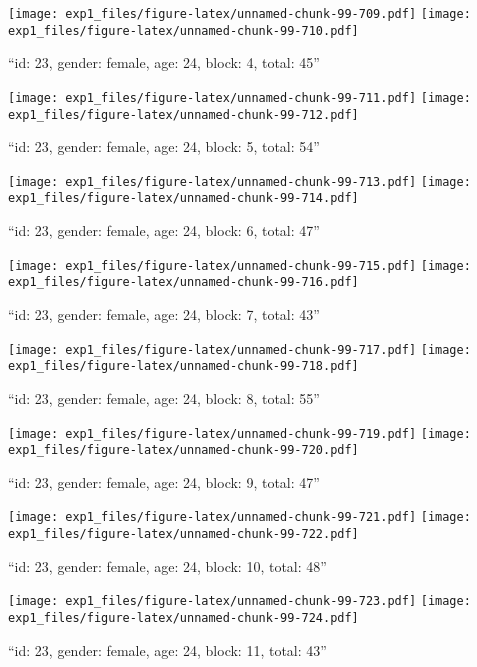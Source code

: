 \documentclass[,]{article}
\begin{document}
\texttt{[image: exp1\_files/figure-latex/unnamed-chunk-99-709.pdf]}
\texttt{[image: exp1\_files/figure-latex/unnamed-chunk-99-710.pdf]}

\newpage
[1] 

``id: 23, gender: female, age: 24, block: 4, total: 45''

\texttt{[image: exp1\_files/figure-latex/unnamed-chunk-99-711.pdf]}
\texttt{[image: exp1\_files/figure-latex/unnamed-chunk-99-712.pdf]}

\newpage
[1] 

``id: 23, gender: female, age: 24, block: 5, total: 54''

\texttt{[image: exp1\_files/figure-latex/unnamed-chunk-99-713.pdf]}
\texttt{[image: exp1\_files/figure-latex/unnamed-chunk-99-714.pdf]}

\newpage
[1] 

``id: 23, gender: female, age: 24, block: 6, total: 47''

\texttt{[image: exp1\_files/figure-latex/unnamed-chunk-99-715.pdf]}
\texttt{[image: exp1\_files/figure-latex/unnamed-chunk-99-716.pdf]}

\newpage
[1] 

``id: 23, gender: female, age: 24, block: 7, total: 43''

\texttt{[image: exp1\_files/figure-latex/unnamed-chunk-99-717.pdf]}
\texttt{[image: exp1\_files/figure-latex/unnamed-chunk-99-718.pdf]}

\newpage
[1] 

``id: 23, gender: female, age: 24, block: 8, total: 55''

\texttt{[image: exp1\_files/figure-latex/unnamed-chunk-99-719.pdf]}
\texttt{[image: exp1\_files/figure-latex/unnamed-chunk-99-720.pdf]}

\newpage
[1] 

``id: 23, gender: female, age: 24, block: 9, total: 47''

\texttt{[image: exp1\_files/figure-latex/unnamed-chunk-99-721.pdf]}
\texttt{[image: exp1\_files/figure-latex/unnamed-chunk-99-722.pdf]}

\newpage
[1] 

``id: 23, gender: female, age: 24, block: 10, total: 48''

\texttt{[image: exp1\_files/figure-latex/unnamed-chunk-99-723.pdf]}
\texttt{[image: exp1\_files/figure-latex/unnamed-chunk-99-724.pdf]}

\newpage
[1] 

``id: 23, gender: female, age: 24, block: 11, total: 43''
\end{document}
